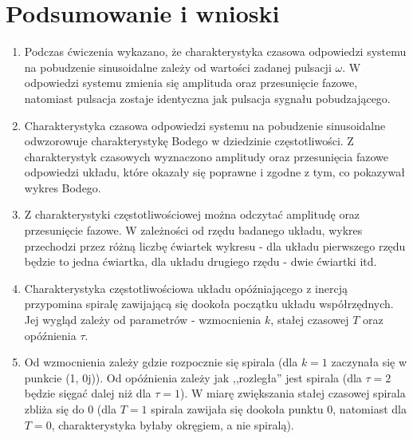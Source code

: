 \documentclass[12pt]{article}
\begin{document}
\section{Podsumowanie i wnioski}
\begin{enumerate}
    \item Podczas ćwiczenia wykazano, że charakterystyka czasowa odpowiedzi systemu na pobudzenie sinusoidalne zależy od wartości zadanej pulsacji $\omega$. W odpowiedzi systemu zmienia się amplituda oraz przesunięcie fazowe, natomiast pulsacja zostaje identyczna jak pulsacja sygnału pobudzającego.
    \item Charakterystyka czasowa odpowiedzi systemu na pobudzenie sinusoidalne odwzorowuje charakterystykę Bodego w dziedzinie częstotliwości. Z charakterystyk czasowych wyznaczono amplitudy oraz przesunięcia fazowe odpowiedzi układu, które okazały się poprawne i zgodne z tym, co pokazywał wykres Bodego.
    \item Z charakterystyki częstotliwościowej można odczytać amplitudę oraz przesunięcie fazowe. W zależności od rzędu badanego układu, wykres przechodzi przez różną liczbę ćwiartek wykresu - dla układu pierwszego rzędu będzie to jedna ćwiartka, dla układu drugiego rzędu - dwie ćwiartki itd.
    \item Charakterystyka częstotliwościowa układu opóźniającego z inercją przypomina spiralę zawijającą się dookoła początku układu współrzędnych. Jej wygląd zależy od parametrów - wzmocnienia $k$, stałej czasowej $T$ oraz opóźnienia $\tau$. 
    \item Od wzmocnienia zależy gdzie rozpocznie się spirala (dla $k=1$ zaczynała się w punkcie (1, 0j)). Od opóźnienia zależy jak ,,rozległa'' jest spirala (dla $\tau = 2$ będzie sięgać dalej niż dla $\tau = 1$). W miarę zwiększania stałej czasowej spirala zbliża się do 0 (dla $T=1$ spirala zawijała się dookoła punktu 0, natomiast dla $T=0$, charakterystyka byłaby okręgiem, a nie spiralą). 
\end{enumerate}
\end{document}
